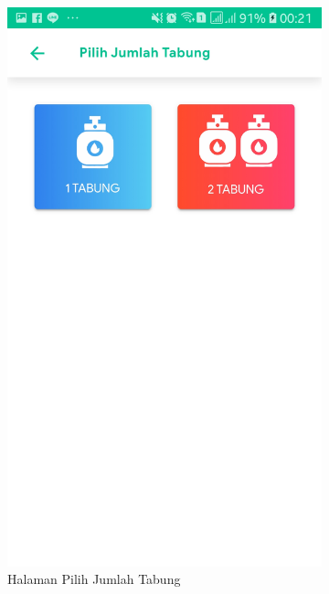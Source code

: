 	\begin{figure}[H] \ContinuedFloat
	\centering
		\begin{subfigure}[b]{0.43\linewidth}
		\includegraphics [width = \linewidth]{gambar/android/pilih-tabung}
		\caption{Halaman Pilih Jumlah Tabung}
	\end{subfigure}
	\begin{subfigure}[b]{0.43\linewidth}

\end{subfigure}
\end{figure}
